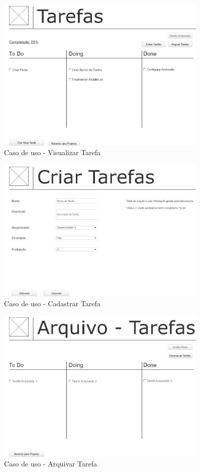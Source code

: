 \begin{figure}[H]
  \center
  \includegraphics[width=0.9\textwidth]{figuras/Prototipo5}
  \caption{Caso de uso - Visualizar Tarefa}
  \label{fig:uc-visualizar-tarefa}
\end{figure}

\begin{figure}[H]
  \center
  \includegraphics[width=0.9\textwidth]{figuras/Prototipo6}
  \caption{Caso de uso - Cadastrar Tarefa}
  \label{fig:uc-cadastrar-tarefa}
\end{figure}

\begin{figure}[H]
  \center
  \includegraphics[width=0.9\textwidth]{figuras/Prototipo7}
  \caption{Caso de uso - Arquivar Tarefa}
  \label{fig: uc-arquivar-tarefa}
\end{figure}

